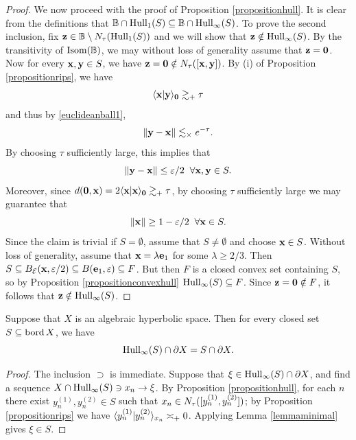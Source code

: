 \begin{proof}
We now proceed with the proof of Proposition \ref{propositionhull}. It is clear from the definitions that $\B\cap\Hull_1(S) \subset \B\cap\Hull_\infty(S)$. To prove the second inclusion, fix $\zz\in\B \butnot \thicken_\tau(\Hull_1(S))$ and we will show that $\mathbf z\notin\operatorname{Hull}_\infty(S)$. By the transitivity of $\Isom(\B)$, we may without loss of generality assume that $\mathbf z = \mathbf 0$. Now for every $\mathbf x, \mathbf y\in S$, we have $\mathbf z = \mathbf 0 \notin N_\tau([\mathbf x,\mathbf y])$. By (i) of Proposition \ref{propositionrips}, we have
\[
\langle \mathbf x | \mathbf y \rangle_\mathbf 0 \gtrsim_+ \tau
\]
and thus by \eqref{euclideanball1},
\[
\|\mathbf y - \mathbf x\| \lesssim_\times e^{-\tau}.
\]
By choosing $\tau$ sufficiently large, this implies that
\[
\|\mathbf y - \mathbf x\| \leq \varepsilon/2 \;\;\forall \mathbf x,\mathbf y\in S.
\]
Moreover, since $d(\mathbf 0,\mathbf x) = 2\langle \mathbf x | \mathbf x \rangle_\mathbf 0 \gtrsim_+ \tau$, by choosing $\tau$ sufficiently large we may guarantee that
\[
\|\mathbf x\| \geq 1 - \varepsilon/2 \;\;\forall \mathbf x\in S.
\]
Since the claim is trivial if $S = \emptyset$, assume that $S\neq \emptyset$ and choose $\mathbf x\in S$. Without loss of generality, assume that $\mathbf x = \lambda \mathbf e_1$ for some $\lambda \geq 2/3$. Then $S \subseteq B_\mathcal E(\mathbf x,\varepsilon/2) \subseteq B(\mathbf e_1,\varepsilon) \subseteq F$. But then $F$ is a closed convex set containing $S$, so by Proposition \ref{propositionconvexhull} $\operatorname{Hull}_\infty(S) \subseteq F$. Since $\mathbf z = \mathbf 0 \notin F$, it follows that $\mathbf z\notin\operatorname{Hull}_\infty(S)$.
\end{proof}
\begin{corollary}
\label{corollaryanderson}
Suppose that $X$ is an algebraic hyperbolic space. Then for every closed set $S\subseteq\operatorname{bord} X$, we have
\[
\operatorname{Hull}_\infty(S) \cap \partial X = S\cap \partial X.
\]
\end{corollary}
\begin{proof}
The inclusion $\supset$ is immediate. Suppose that $\xi\in\operatorname{Hull}_\infty(S)\cap\partial X$, and find a sequence $X\cap\operatorname{Hull}_\infty(S)\ni x_n\to \xi$. By Proposition \ref{propositionhull}, for each $n$ there exist $y_n^{(1)},y_n^{(2)}\in S$ such that $x_n\in N_\tau([y_n^{(1)},y_n^{(2)}])$; by Proposition \ref{propositionrips} we have $\langle y_n^{(1)} | y_n^{(2)}\rangle_{x_n} \asymp_+ 0$. Applying Lemma \ref{lemmaminimal} gives $\xi\in S$.
\end{proof}

